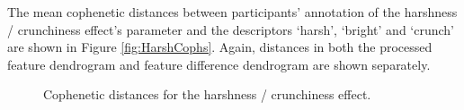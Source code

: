 			The mean cophenetic distances between participants' annotation of the harshness / crunchiness
			effect's parameter and the descriptors `harsh', `bright' and `crunch' are shown in Figure
			\ref{fig:HarshCophs}. Again, distances in both the processed feature dendrogram and
			feature difference dendrogram are shown separately.

			\begin{figure}[h!]
				\centering
				\quad
				\caption{Cophenetic distances for the harshness / crunchiness effect.}
				\label{fig:CrunchCophs}
			\end{figure}


